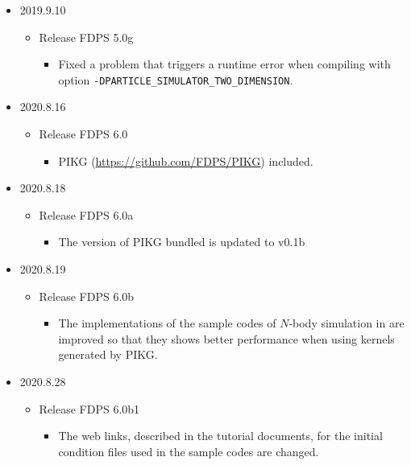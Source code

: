 \begin{itemize}
  \item 2019.9.10
    \begin{itemize}
    \item Release FDPS 5.0g
       \begin{itemize}
          \item Fixed a problem that triggers a runtime error when compiling with option \texttt{-DPARTICLE\_SIMULATOR\_TWO\_DIMENSION}.
       \end{itemize}
    \end{itemize}

  \item 2020.8.16
    \begin{itemize}
    \item Release FDPS 6.0
       \begin{itemize}
          \item PIKG (\url{https://github.com/FDPS/PIKG}) included.
       \end{itemize}
    \end{itemize}
    
  \item 2020.8.18
    \begin{itemize}
    \item Release FDPS 6.0a
       \begin{itemize}
          \item The version of PIKG bundled is updated to v0.1b
       \end{itemize}
    \end{itemize}

  \item 2020.8.19
    \begin{itemize}
    \item Release FDPS 6.0b
       \begin{itemize}
          \item The implementations of the sample codes of $N$-body simulation in  are improved so that they shows better performance when using kernels generated by PIKG.
       \end{itemize}
    \end{itemize}
  \item 2020.8.28
    \begin{itemize}
    \item Release FDPS 6.0b1
       \begin{itemize}
          \item The web links, described in the tutorial documents, for the initial condition files used in the sample codes are changed.
       \end{itemize}
    \end{itemize}



\end{itemize}
